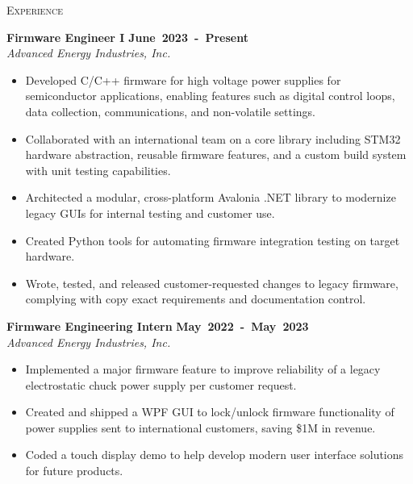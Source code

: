 \documentclass[11pt, a4paper]{article}
\newcommand{\dates}[1]{\hfill\mbox{\textbf{#1}}} %
\newcommand{\headright}[1]{\vspace*{2.5ex}\textsc{\Large\color{cvblue}#1}\par
     \vspace*{-2ex}{\color{cvblue}\hrulefill}\par}
\begin{document}
\begin{minipage}[t]{0.56\textwidth}
\setlength{\parskip}{0.8ex}%
\raggedright

\vspace{2ex}

\headright{Experience}

\textbf{Firmware Engineer I} \dates{June 2023 - Present} \\
\textit{Advanced Energy Industries, Inc.}
\begin{itemize}
    \item Developed C/C++ firmware for high voltage power supplies for semiconductor applications, enabling features such as digital control loops, data collection, communications, and non-volatile settings.
    \item Collaborated with an international team on a core library including STM32 hardware abstraction, reusable firmware features, and a custom build system with unit testing capabilities.
    \item Architected a modular, cross-platform Avalonia .NET library to modernize legacy GUIs for internal testing and customer use.
    \item Created Python tools for automating firmware integration testing on target hardware.
    \item Wrote, tested, and released customer-requested changes to legacy firmware, complying with copy exact requirements and documentation control.
\end{itemize}

\textbf{Firmware Engineering Intern} \dates{May 2022 - May 2023} \\
\textit{Advanced Energy Industries, Inc.}
\begin{itemize}
    \item Implemented a major firmware feature to improve reliability of a legacy electrostatic chuck power supply per customer request.
    \item Created and shipped a WPF GUI to lock/unlock firmware functionality of power supplies sent to international customers, saving \$1M in revenue.
    \item Coded a touch display demo to help develop modern user interface solutions for future products.
\end{itemize}


\end{minipage}
\end{document}
